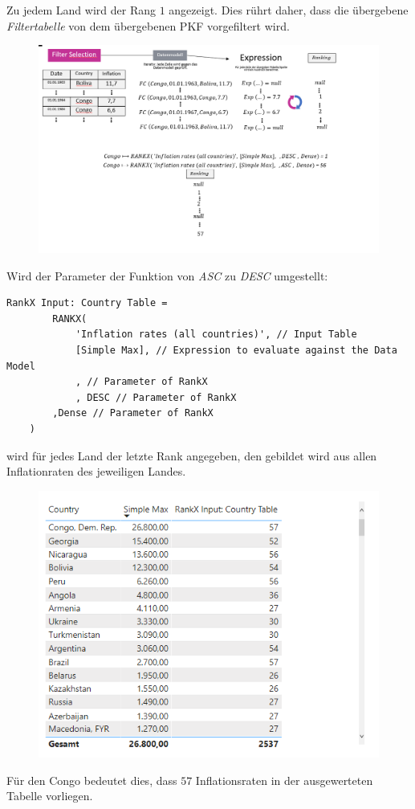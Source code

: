 Zu jedem Land wird der Rang $1$ angezeigt. Dies rührt daher, dass die übergebene \textit{Filtertabelle} von dem übergebenen \gls{PKF} vorgefiltert wird. 
\begin{figure}[H]
	\centering
	\includegraphics[scale = 0.3]{attachment/chapter_1/Scc150}
\end{figure}
Wird der Parameter der Funktion von \textit{ASC} zu \textit{DESC} umgestellt:
\begin{lstlisting}[style=DAX]
	RankX Input: Country Table = 
		RANKX(
			'Inflation rates (all countries)', // Input Table
			[Simple Max], // Expression to evaluate against the Data Model
			, // Parameter of RankX
			, DESC // Parameter of RankX
		,Dense // Parameter of RankX
	)
\end{lstlisting}
 wird für jedes Land der letzte Rank angegeben, den gebildet wird aus allen Inflationraten des jeweiligen Landes.

\begin{figure}[H]
	\centering
	\includegraphics[scale = 0.3]{attachment/chapter_1/Scc151}
\end{figure}
Für den Congo bedeutet dies, dass $57$ Inflationsraten in der ausgewerteten Tabelle vorliegen.

